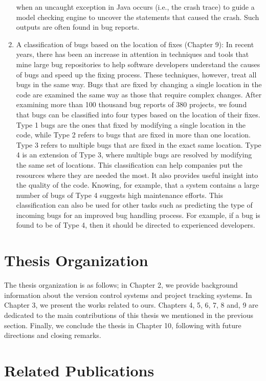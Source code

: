 \documentclass[12pt]{report}
\begin{document}
\begin{enumerate}
  when an uncaught exception in Java occurs (i.e., the crash trace) to
  guide a model checking engine to uncover the statements that caused
  the crash. Such outputs are often found in bug reports.
\item
  A classification of bugs based on the location of fixes (Chapter 9):
  In recent years, there has been an increase in attention in techniques
  and tools that mine large bug repositories to help software developers
  understand the causes of bugs and speed up the fixing process. These
  techniques, however, treat all bugs in the same way. Bugs that are
  fixed by changing a single location in the code are examined the same
  way as those that require complex changes. After examining more than
  100 thousand bug reports of 380 projects, we found that bugs can be
  classified into four types based on the location of their fixes. Type
  1 bugs are the ones that fixed by modifying a single location in the
  code, while Type 2 refers to bugs that are fixed in more than one
  location. Type 3 refers to multiple bugs that are fixed in the exact
  same location. Type 4 is an extension of Type 3, where multiple bugs
  are resolved by modifying the same set of locations. This
  classification can help companies put the resources where they are
  needed the most. It also provides useful insight into the quality of
  the code. Knowing, for example, that a system contains a large number
  of bugs of Type 4 suggests high maintenance efforts. This
  classification can also be used for other tasks such as predicting the
  type of incoming bugs for an improved bug handling process. For
  example, if a bug is found to be of Type 4, then it should be directed
  to experienced developers.
\end{enumerate}

\section{Thesis Organization}\label{thesis-organization}

The thesis organization is as follows; in Chapter 2, we provide
background information about the version control systems and project
tracking systems. In Chapter 3, we present the works related to ours.
Chapters 4, 5, 6, 7, 8 and, 9 are dedicated to the main contributions of
this thesis we mentioned in the previous section. Finally, we conclude
the thesis in Chapter 10, following with future directions and closing
remarks.

\section{Related Publications}\label{related-publications}
\end{document}
